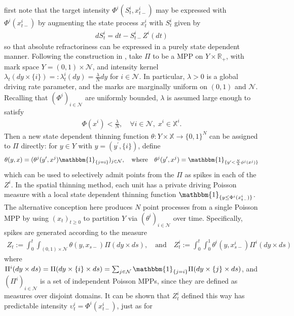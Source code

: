\documentclass[12pt, oneside]{report}
\newcommand{\mbb}[1]{\mathbb{#1}}
\newcommand{\1}[1]{\mathbbm{1}_{\{#1\}}}
\newcommand{\mc}[1]{\mathcal{#1}}
\theoremstyle{definition}
\begin{document}
first note that the target intensity $\Phi^i(S^i_t,x^i_{t-})$ may be expressed
with $\Phi^i(x^i_{t-})$ by augmenting the state process $x^i_t$ with $S^i_t$
given by
\begin{align}
    dS^i_t=dt-S^i_{t-}Z^i(dt)\label{eq50}
\end{align}
so that absolute refractoriness can be expressed in a purely state dependent
manner. Following the construction in \cite[\S 3]{Glasserman_Merener_2003}, take
$\Pi$ to be a MPP on $Y\times\mbb{R}_+$, with mark space $Y=(0,1)\times\mc{N}$,
and intensity kernel
$\lambda_t(dy\times\{i\})=:\lambda^i_t(dy)=\frac{\lambda}{N}dy$ for
$i\in\mc{N}$. In particular, $\lambda>0$ is a global driving rate parameter, and
the marks are marginally uniform on $(0,1)$ and $\mc{N}$. Recalling that
$(\Phi^i)_{i\in\mc{N}}$ are uniformly bounded, $\lambda$ is assumed large enough
to satisfy
\begin{align}
    \Phi(x^i)<\frac{\lambda}{N},\quad \forall i\in\mc{N},\;x^i\in\mbb{X}^i\label{eq51}.
\end{align}
Then a new state dependent thinning function
$\theta:Y\times\mbb{X}\rightarrow\{0,1\}^{N}$ can be assigned to $\Pi$
directly: for $y\in Y$ with $y=(y^\prime,\{i\})$, define
\begin{align}
    \theta(y,x)=(\theta^j(y^\prime,x^j)\1{j=i})_{j\in\mc{N}},\quad\text{where}\quad \theta^j(y^\prime,x^j)=\1{y^\prime<\frac{N}{\lambda}\phi^j(x^j)}\label{eq52}
\end{align}
which can be used to selectively admit points from the $\Pi$ as spikes in each
of the $Z^i$. In the spatial thinning method, each unit has a private driving Poisson
measure with a local state dependent thinning function $\1{y\leq
\Phi^i(x^i_{t-})}$. The alternative conception here produces $N$ point
processes from a single Poisson MPP by using $(x_t)_{t\geq 0}$ to partition $Y$
via $(\theta^i)_{i\in\mc{N}}$ over time. Specifically, spikes are generated
according to the measure
\begin{align}
    Z_t:=\int_0^t\int_{(0,1)\times\mc{N}}\theta(y,x_{s-})\Pi(dy\times ds),\quad\text{and}\quad Z^i_t:=\int_0^t\int_0^1\theta^i(y,x^i_{s-})\Pi^i(dy\times ds)\label{eq53}
\end{align}
where $\Pi^i(dy\times ds)=\Pi(dy\times\{i\}\times
ds)=\sum_{j\in\mc{N}}\1{j=i}\Pi(dy\times\{j\}\times ds)$, and
$(\Pi^i)_{i\in\mc{N}}$ is a set of independent Poisson MPPs, since they are
defined as measures over disjoint domains. It can be shown that $Z^i_t$ defined
this way has predictable intensity $\upsilon^i_t=\Phi^i(x^i_{t-})$, just as for
\end{document}
